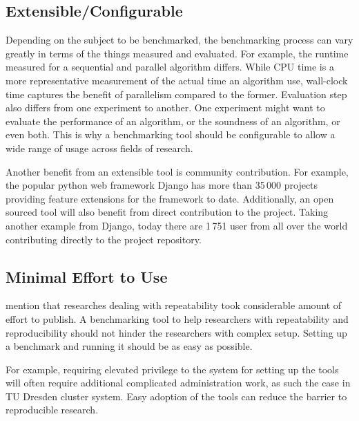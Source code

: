 \subsection{Extensible/Configurable}

Depending on the subject to be benchmarked, the benchmarking process can vary greatly in terms of the things measured and evaluated.
For example, the runtime measured for a sequential and parallel algorithm differs.
While CPU time is a more representative measurement of the actual time an algorithm use, wall-clock time captures the benefit of parallelism compared to the former.
Evaluation step also differs from one experiment to another.
One experiment might want to evaluate the performance of an algorithm, or the soundness of an algorithm, or even both.
This is why a benchmarking tool should be configurable to allow a wide range of usage across fields of research.

Another benefit from an extensible tool is community contribution.
For example, the popular python web framework Django has more than 35\,000 projects providing feature extensions for the framework to date.
Additionally, an open sourced tool will also benefit from direct contribution to the project.
Taking another example from Django, today there are 1\,751 user from all over the world contributing directly to the project repository.


\subsection{Minimal Effort to Use}
\citet{vitekR3RepeatabilityReproducibility2012} mention that researches dealing with repeatability took considerable amount of effort to publish.
A benchmarking tool to help researchers with repeatability and reproducibility should not hinder the researchers with complex setup.
Setting up a benchmark and running it should be as easy as possible.

For example, requiring elevated privilege to the system for setting up the tools will often require additional complicated administration work, as such the case in TU Dresden cluster system.
Easy adoption of the tools can reduce the barrier to reproducible research.


